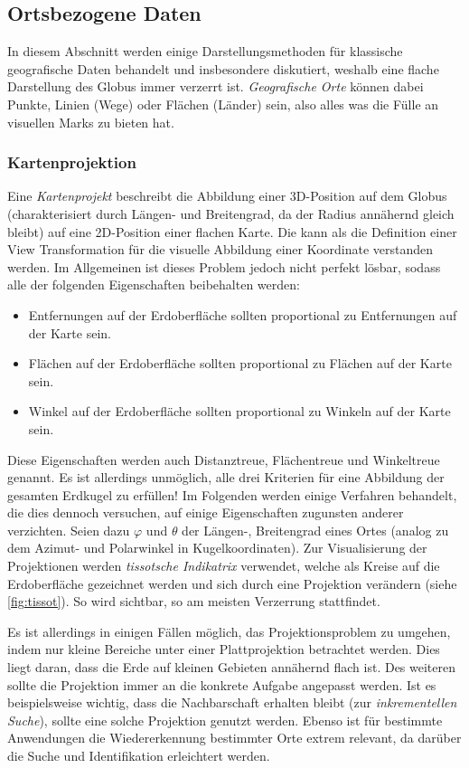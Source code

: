 		\subsection{Ortsbezogene Daten}
			In diesem Abschnitt werden einige Darstellungsmethoden für klassische geografische Daten behandelt und insbesondere diskutiert, weshalb eine flache Darstellung des Globus immer verzerrt ist. \emph{Geografische Orte} können dabei Punkte, Linien (\zB Wege) oder Flächen (\zB Länder) sein, also alles was die Fülle an visuellen Marks zu bieten hat.

			\subsubsection{Kartenprojektion}
				Eine \emph{Kartenprojekt} beschreibt die Abbildung einer 3D-Position auf dem Globus (charakterisiert durch Längen- und Breitengrad, da der Radius annähernd gleich bleibt) auf eine 2D-Position einer flachen Karte. Die kann als die Definition einer View Transformation für die visuelle Abbildung einer Koordinate verstanden werden. Im Allgemeinen ist dieses Problem jedoch nicht perfekt lösbar, sodass alle der folgenden Eigenschaften beibehalten werden:
				\begin{itemize}
					\item Entfernungen auf der Erdoberfläche sollten proportional zu Entfernungen auf der Karte sein.
					\item Flächen auf der Erdoberfläche sollten proportional zu Flächen auf der Karte sein.
					\item Winkel auf der Erdoberfläche sollten proportional zu Winkeln auf der Karte sein.
				\end{itemize}
				Diese Eigenschaften werden auch Distanztreue, Flächentreue und Winkeltreue genannt. Es ist allerdings unmöglich, alle drei Kriterien für eine Abbildung der gesamten Erdkugel zu erfüllen! Im Folgenden werden einige Verfahren behandelt, die dies dennoch versuchen, \bzw auf einige Eigenschaften zugunsten anderer verzichten. Seien dazu \(\varphi\) und \(\theta\) der Längen-, \bzw Breitengrad eines Ortes (analog zu dem Azimut- und Polarwinkel in Kugelkoordinaten). Zur Visualisierung der Projektionen werden \emph{tissotsche Indikatrix} verwendet, welche als Kreise auf die Erdoberfläche gezeichnet werden und sich durch eine Projektion verändern (siehe \autoref{fig:tissot}). So wird sichtbar, so am meisten Verzerrung stattfindet.

				Es ist allerdings in einigen Fällen möglich, das Projektionsproblem zu umgehen, indem nur kleine Bereiche unter einer Plattprojektion betrachtet werden. Dies liegt daran, dass die Erde auf kleinen Gebieten annähernd flach ist. Des weiteren sollte die Projektion immer an die konkrete Aufgabe angepasst werden. Ist es beispielsweise wichtig, dass die Nachbarschaft erhalten bleibt (zur \emph{inkrementellen Suche}), sollte eine solche Projektion genutzt werden. Ebenso ist für bestimmte Anwendungen die Wiedererkennung bestimmter Orte extrem relevant, da darüber die Suche und Identifikation erleichtert werden.

